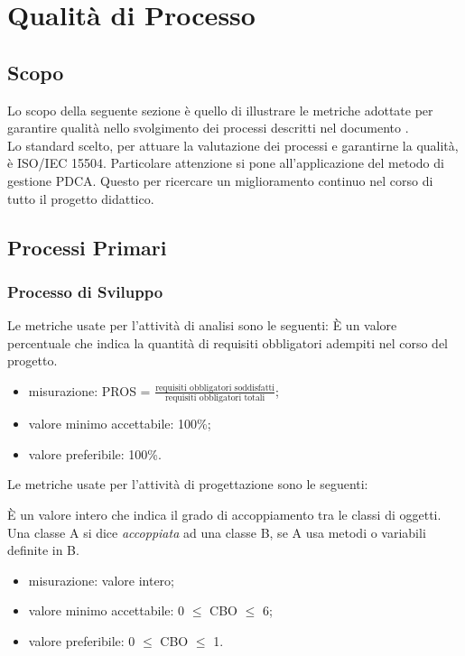 \section{Qualità di Processo}

\subsection{Scopo}
Lo scopo della seguente sezione è quello di illustrare le metriche adottate per garantire qualità nello svolgimento dei processi descritti nel documento \textit{\NdP}. \\ Lo standard scelto, per attuare la valutazione dei processi e garantirne la qualità, è ISO/IEC 15504. Particolare attenzione si pone all'applicazione del metodo di gestione PDCA. Questo per ricercare un miglioramento continuo nel corso di tutto il progetto didattico.

\subsection{Processi Primari}

	\subsubsection{Processo di Sviluppo}
	
		Le metriche usate per l'attività di analisi sono le seguenti:
			È un valore percentuale che indica la quantità di requisiti obbligatori adempiti nel corso del progetto.
		\begin{itemize}
			\item{misurazione: PROS = $\displaystyle\frac{\mbox{requisiti obbligatori soddisfatti}}{\mbox{requisiti obbligatori totali}}$;}
			\item{valore minimo accettabile: 100\%;}
			\item{valore preferibile: 100\%.}
		\end{itemize}

		Le metriche usate per l'attività di progettazione sono le seguenti:
		
			È un valore intero che indica il grado di accoppiamento tra le classi di oggetti. Una classe A si dice \textit{accoppiata} ad una classe B, se A usa metodi o variabili definite in B.
		\begin{itemize}
			\item{misurazione: valore intero;}
			\item{valore minimo accettabile: 0 $\leq$ CBO $\leq$ 6;}
			\item{valore preferibile: 0 $\leq$ CBO $\leq$ 1.}
		\end{itemize}

